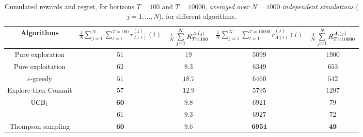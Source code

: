 \begin{table}[ht]
    \begin{small}  %
        \centering
        \begin{tabular}{c|cc|cc}
        \textbf{Algorithms} & $\frac{1}{N} \sum\limits_{j=1}^N \sum\limits_{t=1}^{T=100} r^{(j)}_{A(t)}(t)$ & $\frac{1}{N} \sum\limits_{j=1}^N R^{\mathcal{A},(j)}_{T=100}$ & $\frac{1}{N} \sum\limits_{j=1}^N \sum\limits_{t=1}^{T=10000} r^{(j)}_{A(t)}(t)$ & $\frac{1}{N} \sum\limits_{j=1}^N R^{\mathcal{A},(j)}_{T=10000}$ \\
            \hline
            Pure exploration
                & $51$ & $19$
                & $5099$ & $1900$ \\
            Pure exploitation
                & $62$ & $8.3$
                & $6349$ & $653$ \\
            \hline
            $\varepsilon$-greedy
                & $51$ & $18.7$
                & $6460$ & $542$ \\
            Explore-then-Commit
                & $57$ & $12.9$
                & $5795$ & $1207$ \\
            \hline
            $\mathrm{UCB}_1$
                & $\mathbf{60}$ & $\mathbf{9.8}$
                & $6921$ & $79$ \\
            \klUCB{}
                & $61$ & $9.3$
                & $6927$ & $72$ \\
            \hline
            Thompson sampling
                & $\mathbf{60}$ & $\mathbf{9.6}$
                & $\mathbf{6951}$ & $\mathbf{49}$ \\
        \end{tabular}
        \caption{Cumulated rewards and regret, for horizons $T=100$ and $T=10000$, \emph{averaged over $N=1000$ independent simulations} ($j=1,\dots,N$), for different algorithms.}
        \label{table:2:meanResults}
    \end{small}  %
\end{table}

%


